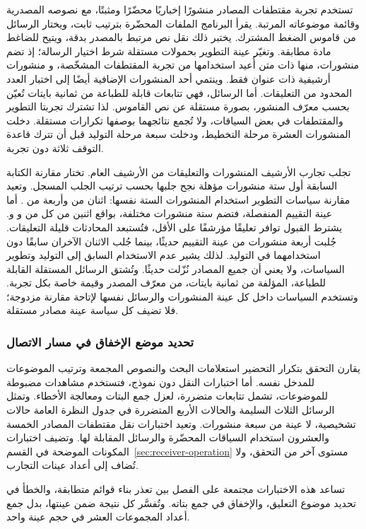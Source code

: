 تستخدم تجربة مقتطفات المصادر \NUM{\DsExcerptPosts} منشورًا إخباريًا محضّرًا ومثبتًا، مع نصوصه المصدرية وقائمة موضوعاته المرتبة. يقرأ البرنامج الملفات المحضّرة بترتيب ثابت، ويختار الرسائل من قاموس الضغط المشترك. يختبر ذلك نقل نص مرتبط بالمصدر بدقة، ويتيح للضاغط مادة مطابقة. وتغيّر عينة التطوير بحمولات مستقلة شرط اختيار الرسالة؛ إذ تضم \NUM{\DsIndependentPosts} منشورات، منها \NUM{\DsDevelopmentReused} ذات متن أُعيد استخدامها من تجربة المقتطفات المشخّصة، و\NUM{\DsDevelopmentAdditional} منشورات أرشيفية ذات عنوان فقط. وينتمي أحد المنشورات الإضافية أيضًا إلى اختبار العدد المحدود من التعليقات. أما الرسائل، فهي تتابعات قابلة للطباعة من ثمانية بايتات تُعيّن بحسب معرّف المنشور، بصورة مستقلة عن نص القاموس. لذا تشترك تجربتا التطوير والمقتطفات في بعض السياقات، ولا تُجمع نتائجهما بوصفها تكرارات مستقلة. دخلت المنشورات العشرة مرحلة التخطيط، ودخلت سبعة مرحلة التوليد قبل أن تترك قاعدة التوقف ثلاثة دون تجربة.

تجلب تجارب الأرشيف المنشورات والتعليقات من الأرشيف العام. تختار مقارنة الكتابة السابقة أول ستة منشورات مؤهلة نجح جلبها بحسب ترتيب الجلب المسجل. وتعيد مقارنة سياسات التطوير استخدام المنشورات الستة نفسها: اثنان من  وأربعة من . أما عينة التقييم المنفصلة، فتضم ستة منشورات مختلفة، بواقع اثنين من كل من  و و. يشترط القبول توافر  تعليقًا مؤرشفًا على الأقل، فتُستبعد المحادثات قليلة التعليقات. جُلبت أربعة منشورات من عينة التقييم حديثًا، بينما جُلب الاثنان الآخران سابقًا دون استخدامهما في التوليد. لذلك يشير عدم الاستخدام السابق إلى التوليد وتطوير السياسات، ولا يعني أن جميع المصادر نُزّلت حديثًا. وتُشتق الرسائل المستقلة القابلة للطباعة، المؤلفة من ثمانية بايتات، من معرّف المصدر وقيمة خاصة بكل تجربة. وتستخدم السياسات داخل كل عينة المنشورات والرسائل نفسها لإتاحة مقارنة مزدوجة؛ فلا تضيف كل سياسة عينة مصادر مستقلة.

\subsubsection{تحديد موضع الإخفاق في مسار الاتصال}
يقارن التحقق بتكرار التحضير استعلامات البحث والنصوص المجمعة وترتيب الموضوعات للمدخل نفسه. أما اختبارات النقل دون نموذج، فتستخدم مشاهدات مضبوطة للموضوعات، تشمل تتابعات متضررة، لعزل جمع البتات ومعالجة الأخطاء. وتمثل الرسائل الثلاث السليمة والحالات الأربع المتضررة في جدول النظرة العامة حالات تشخيصية، لا عينة من سبعة منشورات. وتعيد اختبارات نقل مقتطفات المصادر الخمسة والعشرون استخدام السياقات المحضّرة والرسائل المقابلة لها. وتضيف اختبارات المكونات الموضحة في القسم~\ref{sec:receiver-operation} مستوى آخر من التحقق، ولا تُضاف إلى أعداد عينات التجارب.

تساعد هذه الاختبارات مجتمعة على الفصل بين تعذر بناء قوائم متطابقة، والخطأ في تحديد موضوع التعليق، والإخفاق في جمع بتاته. وتُفسَّر كل نتيجة ضمن عينتها، بدل جمع أعداد المجموعات العشر في حجم عينة واحد.
